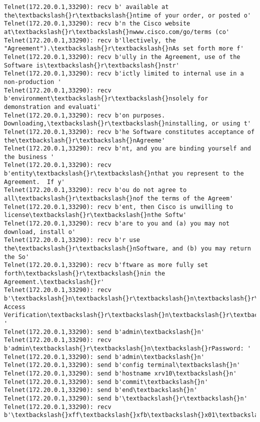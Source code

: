\documentclass[11pt]{article}
\begin{document}
\begin{Verbatim}[commandchars=\\\{\}]
Telnet(172.20.0.1,33290): recv b' available at the\textbackslash{}r\textbackslash{}ntime of your order, or posted o'
Telnet(172.20.0.1,33290): recv b'n the Cisco website at\textbackslash{}r\textbackslash{}nwww.cisco.com/go/terms (co'
Telnet(172.20.0.1,33290): recv b'llectively, the "Agreement").\textbackslash{}r\textbackslash{}nAs set forth more f'
Telnet(172.20.0.1,33290): recv b'ully in the Agreement, use of the Software is\textbackslash{}r\textbackslash{}nstr'
Telnet(172.20.0.1,33290): recv b'ictly limited to internal use in a non-production '
Telnet(172.20.0.1,33290): recv b'environment\textbackslash{}r\textbackslash{}nsolely for demonstration and evaluati'
Telnet(172.20.0.1,33290): recv b'on purposes.  Downloading,\textbackslash{}r\textbackslash{}ninstalling, or using t'
Telnet(172.20.0.1,33290): recv b'he Software constitutes acceptance of the\textbackslash{}r\textbackslash{}nAgreeme'
Telnet(172.20.0.1,33290): recv b'nt, and you are binding yourself and the business '
Telnet(172.20.0.1,33290): recv b'entity\textbackslash{}r\textbackslash{}nthat you represent to the Agreement.  If y'
Telnet(172.20.0.1,33290): recv b'ou do not agree to all\textbackslash{}r\textbackslash{}nof the terms of the Agreem'
Telnet(172.20.0.1,33290): recv b'ent, then Cisco is unwilling to license\textbackslash{}r\textbackslash{}nthe Softw'
Telnet(172.20.0.1,33290): recv b'are to you and (a) you may not download, install o'
Telnet(172.20.0.1,33290): recv b'r use the\textbackslash{}r\textbackslash{}nSoftware, and (b) you may return the So'
Telnet(172.20.0.1,33290): recv b'ftware as more fully set forth\textbackslash{}r\textbackslash{}nin the Agreement.\textbackslash{}r'
Telnet(172.20.0.1,33290): recv b'\textbackslash{}n\textbackslash{}r\textbackslash{}n\textbackslash{}r\textbackslash{}nUser Access Verification\textbackslash{}r\textbackslash{}n\textbackslash{}r\textbackslash{}nUsername: '
Telnet(172.20.0.1,33290): send b'admin\textbackslash{}n'
Telnet(172.20.0.1,33290): recv b'admin\textbackslash{}r\textbackslash{}n\textbackslash{}rPassword: '
Telnet(172.20.0.1,33290): send b'admin\textbackslash{}n'
Telnet(172.20.0.1,33290): send b'config terminal\textbackslash{}n'
Telnet(172.20.0.1,33290): send b'hostname xrv10\textbackslash{}n'
Telnet(172.20.0.1,33290): send b'commit\textbackslash{}n'
Telnet(172.20.0.1,33290): send b'end\textbackslash{}n'
Telnet(172.20.0.1,33290): send b'\textbackslash{}r\textbackslash{}n'
Telnet(172.20.0.1,33290): recv b'\textbackslash{}xff\textbackslash{}xfb\textbackslash{}x01\textbackslash{}xff\textbackslash{}xfb\textbackslash{}x03\textbackslash{}xff\textbackslash{}xfb\textbackslash{}x00\textbackslash{}xff\textbackslash{}xfd\textbackslash{}x00\textbackslash{}x1b]0;xrv10\textbackslash{}x07\textbackslash{}r\textbackslash{}n\textbackslash{}rRP/0/0/CPU0:xrv10\#\textbackslash{}r\textbackslash{}n\textbackslash{}rRP/0'

\end{Verbatim}
\end{document}
